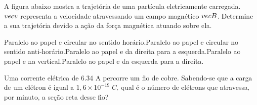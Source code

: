 \documentclass[12pt, addpoints]{exam}
\begin{document}
        \begin{questions}
\begin{multicols*}{2}
\question[20] A ﬁgura abaixo mostra a trajetória de uma partícula eletricamente carregada. $\\vec{{v}}$ representa a velocidade atravessando um campo magnético $\\vec{{B}}$. Determine a sua trajetória devido a ação da força magnética atuando sobre ela.
        
        \begin{center}
            \begin{minipage}[c]{0.5\linewidth}
            \end{minipage}
        \end{center}

        

\begin{choices}
\choice Paralelo ao papel e circular no sentido horário.\choice Paralelo ao papel e circular no sentido anti-horário.\choice Paralelo ao papel e da direita para a esquerda.\choice Paralelo ao papel e na vertical.\choice Paralelo ao papel e da esquerda para a direita.\end{choices}
\question[20] Uma corrente elétrica de    6.34 A percorre um ﬁo de cobre. Sabendo-se que a carga de um elétron é igual a $1,6\times 10^{-19}\;C$, qual é o número de elétrons que atravessa, por minuto, a seção reta desse ﬁo?


\end{multicols*}
\end{questions}
\end{document}
